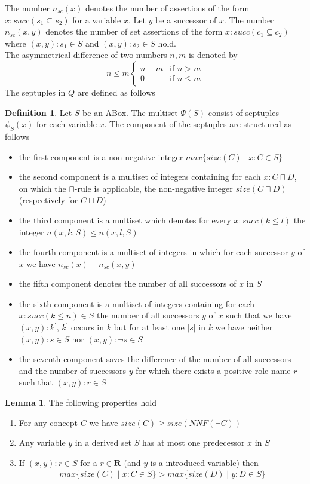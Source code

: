 \documentclass[a4paper,11pt]{scrartcl}
\theoremstyle{break}
\theoremstyle{definition}
\newtheorem{mydef}{Definition}
\newtheorem{mylem}{Lemma}
\begin{document}
The number $n_{sc}(x)$ denotes the number of assertions of the form $x:succ(s_1\subseteq s_2)$ for a variable $x$. Let $y$ be a successor of $x$. The number $n_{sc}(x,y)$ denotes the number of set assertions of the form $x:succ(c_1\subseteq c_2)$ where $(x,y):s_1\in S$ and $(x,y):s_2\in S$ hold.\\
The asymmetrical difference of two numbers $n,m$ is denoted by 
\begin{equation*}
n\unlhd m \begin{cases}
n-m& \text{if } n> m\\
0 & \text{if } n\leq m
\end{cases}
\end{equation*}
The septuples in $Q$ are defined as follows
\begin{mydef}
Let $S$ be an ABox. The multiset $\Psi(S)$ consist of septuples $\psi_S(x)$ for each variable $x$. The component of the septuples are structured as follows
\begin{itemize}
\item the first component is a non-negative integer $max\{size(C)\mid x:C\in S\}$
\item the second component is a multiset of integers containing for each $x:C\sqcap D$, on which the $\sqcap$-rule is applicable, the non-negative integer $size(C\sqcap D)$ (respectively for $C\sqcup D$)
\item the third component is a multiset which denotes for every $x:succ(k\leq l)$ the integer $n(x,k,S)\unlhd n(x,l,S)$
\item the fourth component is a multiset of integers in which for each successor $y$ of $x$ we have $n_{sc}(x)-n_{sc}(x,y)$
\item the fifth component denotes the number of all successors of $x$ in $S$
\item the sixth component is a multiset of integers containing for each $x:succ(k\leq n)\in S$ the number of all successors $y$ of $x$ such that we have $(x,y):k^\prime$, $k^\prime$ occurs in $k$ but for at least one $|s|$ in $k$ we have neither $(x,y):s\in S$ nor $(x,y):\neg s\in S$
\item the seventh component saves the difference of the number of all successors and the number of successors $y$ for which there exists a positive role name $r$ such that $(x,y):r\in S$
\end{itemize}
\end{mydef}
\begin{mylem}
The following properties hold
\begin{enumerate}
\item For any concept $C$ we have $size(C)\geq size(NNF(\neg C))$
 \item Any variable $y$ in a derived set $S$ has at most one predecessor $x$ in $S$
\item If $(x,y):r\in S$ for a $r\in\mathbf{R}$ (and $y$ is a introduced variable) then 
\begin{align*}
max\{size(C)\mid x:C\in S\}>max\{size(D)\mid y:D \in S\}
\end{align*}
\end{enumerate}
\end{mylem}
\end{document}
